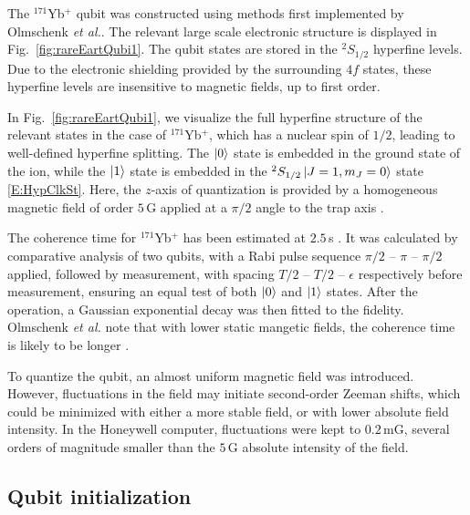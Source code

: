 \documentclass[12pt,a4paper]{amsart}
\numberwithin{equation}{section}
\theoremstyle{plain}
\theoremstyle{definition}
\begin{document}
The ${}^{171}$Yb$^+$ qubit was constructed using methods first implemented by Olmschenk \textit{et al.}\cite{rareEartQubi}. The relevant large scale electronic structure is displayed in Fig.~\ref{fig:rareEartQubi1}. The qubit states are stored in the ${}^2S_{1/2}$ hyperfine levels. Due to the electronic shielding provided by the surrounding $4f$ states, these hyperfine levels are insensitive to magnetic fields, up to first order. 


In Fig.~\ref{fig:rareEartQubi1}, we visualize the full hyperfine structure of the relevant states in the case of ${}^{171}$Yb$^+$, which has a nuclear spin of $1/2$, leading to well-defined hyperfine splitting. The $\ket{0}$ state is embedded in the ground state of the ion, while the $\ket{1}$ state is embedded in the ${}^2S_{1/2}\ket{J=1,m_J=0}$ state \eqref{E:HypClkSt}. Here, the $z$-axis of quantization is provided by a homogeneous magnetic field of order $5\,$G applied at a $\pi/2$ angle to the trap axis \cite{honeywell}. 


The coherence time for ${}^{171}$Yb$^+$ has been estimated at $2.5\,$s \cite{rareEartQubi}. It was calculated by comparative analysis of two qubits, with a Rabi pulse sequence $\pi/2$ -- $\pi$ -- $\pi/2$ applied, followed by measurement, with spacing $T/2$ -- $T/2$ -- $\epsilon$ respectively before measurement, ensuring an equal test of both $\ket{0}$ and $\ket{1}$ states. After the operation, a Gaussian exponential decay was then fitted to the fidelity. Olmschenk \textit{et al.} note that with lower static mangetic fields, the coherence time is likely to be longer \cite{rareEartQubi}. 


To quantize the qubit, an almost uniform magnetic field was introduced. However, fluctuations in the field may initiate second-order Zeeman shifts, which could be minimized with either a more stable field, or with lower absolute field intensity. In the Honeywell computer, fluctuations were kept to $0.2\,$mG, several orders of magnitude smaller than the $5\,$G absolute intensity of the field.



\subsection{Qubit initialization}
\end{document}
